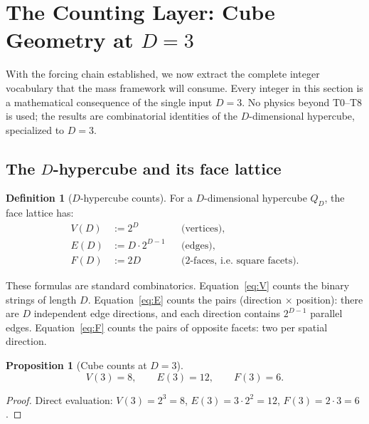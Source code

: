 \documentclass[11pt,a4paper]{article}
\newtheorem{proposition}[theorem]{Proposition}
\theoremstyle{definition}
\newtheorem{definition}[theorem]{Definition}
\theoremstyle{remark}
\begin{document}
\section{The Counting Layer: Cube Geometry at $D = 3$}
\label{sec:counting_layer}

With the forcing chain established, we now extract the complete integer
vocabulary that the mass framework will consume.  Every integer in this
section is a mathematical consequence of the single input $D = 3$.  No
physics beyond T0--T8 is used; the results are combinatorial identities of
the $D$-dimensional hypercube, specialized to $D = 3$.

\subsection{The $D$-hypercube and its face lattice}

\begin{definition}[$D$-hypercube counts]
\label{def:cube_counts}
For a $D$-dimensional hypercube $Q_D$, the face lattice has:
\begin{align}
  V(D) &:= 2^D && \text{(vertices)}, \label{eq:V} \\
  E(D) &:= D \cdot 2^{D-1} && \text{(edges)}, \label{eq:E} \\
  F(D) &:= 2D && \text{(2-faces, i.e.\ square facets)}. \label{eq:F}
\end{align}
\end{definition}

\noindent
These formulas are standard combinatorics.  Equation~\eqref{eq:V} counts the
binary strings of length $D$.  Equation~\eqref{eq:E} counts the pairs
(direction $\times$ position): there are $D$ independent edge directions,
and each direction contains $2^{D-1}$ parallel edges.
Equation~\eqref{eq:F} counts the pairs of opposite facets: two per spatial
direction.

\begin{proposition}[Cube counts at $D = 3$]
\label{prop:D3_counts}
\begin{equation}
  V(3) = 8, \qquad E(3) = 12, \qquad F(3) = 6.
  \label{eq:D3_counts}
\end{equation}
\end{proposition}

\begin{proof}
Direct evaluation:
$V(3) = 2^3 = 8$,\;
$E(3) = 3 \cdot 2^2 = 12$,\;
$F(3) = 2 \cdot 3 = 6$.
\end{proof}
\end{document}
